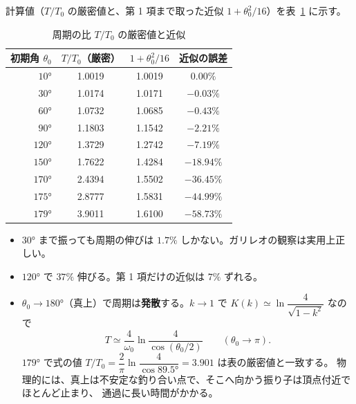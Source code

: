 計算値（$T/T_0$ の厳密値と、第 1 項まで取った近似 $1+\theta_0^2/16$）を表~\ref{tab:pend-ratio} に示す。

\begin{table}[htbp]
\centering
\caption{周期の比 $T/T_0$ の厳密値と近似}\label{tab:pend-ratio}
\begin{tabular}{rccc}
\toprule
初期角 $\theta_0$ & $T/T_0$（厳密） & $1+\theta_0^2/16$ & 近似の誤差 \\
\midrule
$\ang{10}$  & 1.0019 & 1.0019 & $0.00\%$ \\
$\ang{30}$  & 1.0174 & 1.0171 & $-0.03\%$ \\
$\ang{60}$  & 1.0732 & 1.0685 & $-0.43\%$ \\
$\ang{90}$  & 1.1803 & 1.1542 & $-2.21\%$ \\
$\ang{120}$ & 1.3729 & 1.2742 & $-7.19\%$ \\
$\ang{150}$ & 1.7622 & 1.4284 & $-18.94\%$ \\
$\ang{170}$ & 2.4394 & 1.5502 & $-36.45\%$ \\
$\ang{175}$ & 2.8777 & 1.5831 & $-44.99\%$ \\
$\ang{179}$ & 3.9011 & 1.6100 & $-58.73\%$ \\
\bottomrule
\end{tabular}
\end{table}


\begin{itemize}
  \item $\ang{30}$ まで振っても周期の伸びは $1.7\%$ しかない。ガリレオの観察は実用上正しい。
  \item $\ang{120}$ で $37\%$ 伸びる。第 1 項だけの近似は $7\%$ ずれる。
  \item $\theta_0\to\ang{180}$（真上）で周期は\textbf{発散}する。$k\to1$ で
    $K(k)\simeq\ln\dfrac{4}{\sqrt{1-k^2}}$ なので
    \begin{equation}
      T\simeq\frac{4}{\omega_0}\ln\frac{4}{\cos(\theta_0/2)}\qquad(\theta_0\to\pi).
    \end{equation}
    $\ang{179}$ で式の値 $T/T_0=\dfrac2\pi\ln\dfrac{4}{\cos\ang{89.5}}=3.901$ は表の厳密値と一致する。
    物理的には、真上は不安定な釣り合い点で、そこへ向かう振り子は頂点付近でほとんど止まり、
    通過に長い時間がかかる。
\end{itemize}

